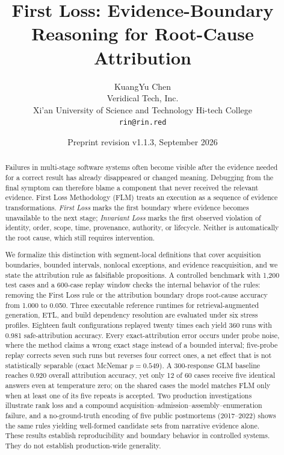 \documentclass[10pt]{article}
\title{First Loss: Evidence-Boundary Reasoning for Root-Cause Attribution}
\author{KuangYu Chen\\
Veridical Tech, Inc.\\
Xi'an University of Science and Technology Hi-tech College\\
\texttt{rin@rin.red}}
\date{Preprint revision v1.1.3, September 2026}
\begin{document}
\maketitle

\begin{abstract}
Failures in multi-stage software systems often become visible after the evidence needed for a correct result has already disappeared or changed meaning. Debugging from the final symptom can therefore blame a component that never received the relevant evidence. First Loss Methodology (FLM) treats an execution as a sequence of evidence transformations. \emph{First Loss} marks the first boundary where evidence becomes unavailable to the next stage; \emph{Invariant Loss} marks the first observed violation of identity, order, scope, time, provenance, authority, or lifecycle. Neither is automatically the root cause, which still requires intervention.

We formalize this distinction with segment-local definitions that cover acquisition boundaries, bounded intervals, nonlocal exceptions, and evidence reacquisition, and we state the attribution rule as falsifiable propositions. A controlled benchmark with 1,200 test cases and a 600-case replay window checks the internal behavior of the rules: removing the First Loss rule or the attribution boundary drops root-cause accuracy from 1.000 to 0.050. Three executable reference runtimes for retrieval-augmented generation, ETL, and build dependency resolution are evaluated under six stress profiles. Eighteen fault configurations replayed twenty times each yield 360 runs with 0.981 safe-attribution accuracy. Every exact-attribution error occurs under probe noise, where the method claims a wrong exact stage instead of a bounded interval; five-probe replay corrects seven such runs but reverses four correct ones, a net effect that is not statistically separable (exact McNemar $p=0.549$). A 300-response GLM baseline reaches 0.920 overall attribution accuracy, yet only 12 of 60 cases receive five identical answers even at temperature zero; on the shared cases the model matches FLM only when at least one of its five repeats is accepted. Two production investigations illustrate rank loss and a compound acquisition--admission--assembly--enumeration failure, and a no-ground-truth encoding of five public postmortems (2017--2022) shows the same rules yielding well-formed candidate sets from narrative evidence alone. These results establish reproducibility and boundary behavior in controlled systems. They do not establish production-wide generality.
\end{abstract}
\end{document}
